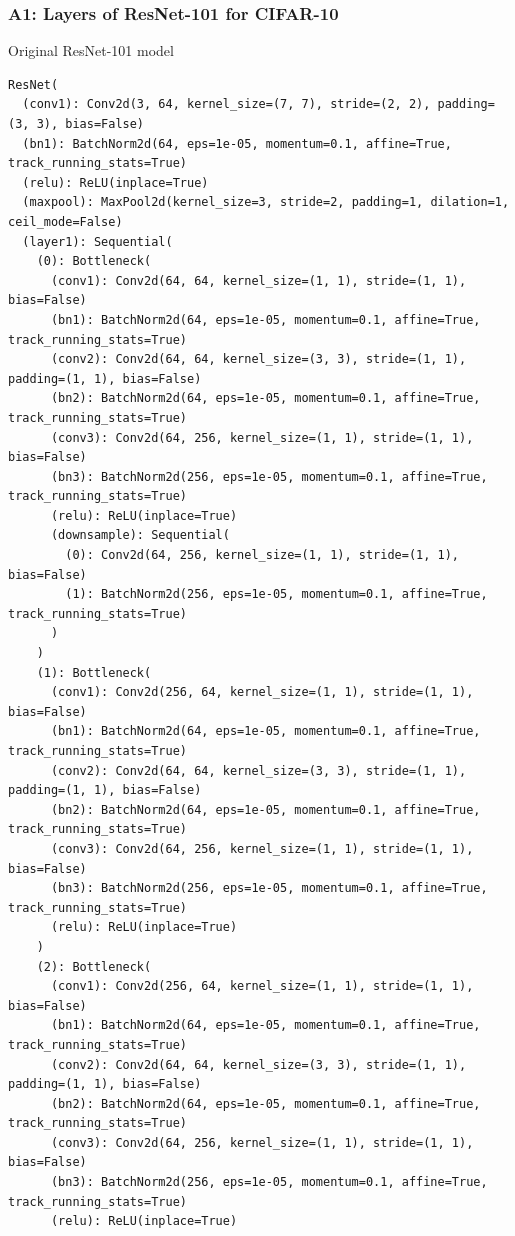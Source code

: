 \documentclass{article}
\begin{document}
\subsubsection{A1: Layers of ResNet-101 for CIFAR-10}
\label{sec:A2}
Original ResNet-101 model
\begin{verbatim}
ResNet(
  (conv1): Conv2d(3, 64, kernel_size=(7, 7), stride=(2, 2), padding=(3, 3), bias=False)
  (bn1): BatchNorm2d(64, eps=1e-05, momentum=0.1, affine=True, track_running_stats=True)
  (relu): ReLU(inplace=True)
  (maxpool): MaxPool2d(kernel_size=3, stride=2, padding=1, dilation=1, ceil_mode=False)
  (layer1): Sequential(
    (0): Bottleneck(
      (conv1): Conv2d(64, 64, kernel_size=(1, 1), stride=(1, 1), bias=False)
      (bn1): BatchNorm2d(64, eps=1e-05, momentum=0.1, affine=True, track_running_stats=True)
      (conv2): Conv2d(64, 64, kernel_size=(3, 3), stride=(1, 1), padding=(1, 1), bias=False)
      (bn2): BatchNorm2d(64, eps=1e-05, momentum=0.1, affine=True, track_running_stats=True)
      (conv3): Conv2d(64, 256, kernel_size=(1, 1), stride=(1, 1), bias=False)
      (bn3): BatchNorm2d(256, eps=1e-05, momentum=0.1, affine=True, track_running_stats=True)
      (relu): ReLU(inplace=True)
      (downsample): Sequential(
        (0): Conv2d(64, 256, kernel_size=(1, 1), stride=(1, 1), bias=False)
        (1): BatchNorm2d(256, eps=1e-05, momentum=0.1, affine=True, track_running_stats=True)
      )
    )
    (1): Bottleneck(
      (conv1): Conv2d(256, 64, kernel_size=(1, 1), stride=(1, 1), bias=False)
      (bn1): BatchNorm2d(64, eps=1e-05, momentum=0.1, affine=True, track_running_stats=True)
      (conv2): Conv2d(64, 64, kernel_size=(3, 3), stride=(1, 1), padding=(1, 1), bias=False)
      (bn2): BatchNorm2d(64, eps=1e-05, momentum=0.1, affine=True, track_running_stats=True)
      (conv3): Conv2d(64, 256, kernel_size=(1, 1), stride=(1, 1), bias=False)
      (bn3): BatchNorm2d(256, eps=1e-05, momentum=0.1, affine=True, track_running_stats=True)
      (relu): ReLU(inplace=True)
    )
    (2): Bottleneck(
      (conv1): Conv2d(256, 64, kernel_size=(1, 1), stride=(1, 1), bias=False)
      (bn1): BatchNorm2d(64, eps=1e-05, momentum=0.1, affine=True, track_running_stats=True)
      (conv2): Conv2d(64, 64, kernel_size=(3, 3), stride=(1, 1), padding=(1, 1), bias=False)
      (bn2): BatchNorm2d(64, eps=1e-05, momentum=0.1, affine=True, track_running_stats=True)
      (conv3): Conv2d(64, 256, kernel_size=(1, 1), stride=(1, 1), bias=False)
      (bn3): BatchNorm2d(256, eps=1e-05, momentum=0.1, affine=True, track_running_stats=True)
      (relu): ReLU(inplace=True)

\end{verbatim}
\end{document}
